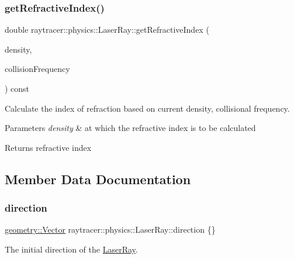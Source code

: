 \subsubsection{\texorpdfstring{get\+Refractive\+Index()}{getRefractiveIndex()}}
{\footnotesize\ttfamily double raytracer\+::physics\+::\+Laser\+Ray\+::get\+Refractive\+Index (\begin{DoxyParamCaption}\item[{const \hyperlink{structraytracer_1_1physics_1_1Density}{Density} \&}]{density,  }\item[{const \hyperlink{structraytracer_1_1physics_1_1Frequency}{Frequency} \&}]{collision\+Frequency }\end{DoxyParamCaption}) const}



Calculate the index of refraction based on current density, collisional frequency. 


\begin{DoxyParams}{Parameters}
{\em density} & at which the refractive index is to be calculated \\
\hline
\end{DoxyParams}
\begin{DoxyReturn}{Returns}
refractive index 
\end{DoxyReturn}


\subsection{Member Data Documentation}
\mbox{\label{structraytracer_1_1physics_1_1LaserRay_a9244628df4215dc86dcbe134c847e54d}} 
\subsubsection{\texorpdfstring{direction}{direction}}
{\footnotesize\ttfamily \hyperlink{classraytracer_1_1geometry_1_1Vector}{geometry\+::\+Vector} raytracer\+::physics\+::\+Laser\+Ray\+::direction \{\}}



The initial direction of the \hyperlink{structraytracer_1_1physics_1_1LaserRay}{Laser\+Ray}. 

\mbox{\label{structraytracer_1_1physics_1_1LaserRay_aed5483243c44e1a7535b249afae7b1ad}} 
